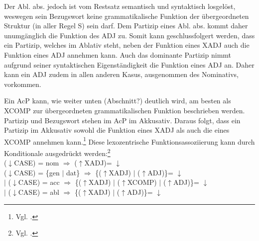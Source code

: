 \documentclass[12pt,a4paper]{article}
\begin{document}
Der Abl. abs. jedoch ist vom Restsatz semantisch und syntaktisch losgelöst, weswegen sein Bezugswort keine grammatikalische Funktion der übergeordneten Struktur (in aller Regel S) sein darf. Dem Partizip eines Abl. abs. kommt daher unumgänglich die Funktion des ADJ zu. Somit kann geschlussfolgert werden, dass ein Partizip, welches im Ablativ steht, neben der Funktion eines XADJ auch die Funktion eines ADJ annehmen kann. Auch das dominante Partizip nimmt aufgrund seiner syntaktischen Eigenständigkeit die Funktion eines ADJ an. Daher kann ein ADJ zudem in allen anderen Kasus, ausgenommen des Nominativs, vorkommen.

Ein AcP kann, wie weiter unten (Abschnitt?) deutlich wird, am besten als XCOMP zur übergeordneten grammatikalischen Funktion beschrieben werden. Partizip und Bezugswort stehen im AcP im Akkusativ. Daraus folgt, dass ein Partizip im Akkusativ sowohl die Funktion eines XADJ als auch die eines XCOMP annehmen kann.\footnote{Vgl. \cite[48]{Skript}.} Diese lexozentrische Funktionsassoziierung kann durch Konditionale ausgedrückt werden:\footnote{Vgl. \cite[48]{Skript}.} \\
($\downarrow$CASE) = nom $\Rightarrow$ ($\uparrow$XADJ)= $\downarrow$ \\
($\downarrow$CASE) = \{gen $\mid$ dat\} $\Rightarrow$ \{($\uparrow$XADJ) $\mid$ ($\uparrow$ADJ)\}= $\downarrow$ \\
$\mid$ ($\downarrow$CASE) = acc $\Rightarrow$ \{($\uparrow$XADJ) $\mid$ ($\uparrow$XCOMP) $\mid$ ($\uparrow$ADJ)\}= $\downarrow$ \\
$\mid$ ($\downarrow$CASE) = abl $\Rightarrow$ \{($\uparrow$XADJ) $\mid$ ($\uparrow$ADJ)\}= $\downarrow$ 
\end{document}
